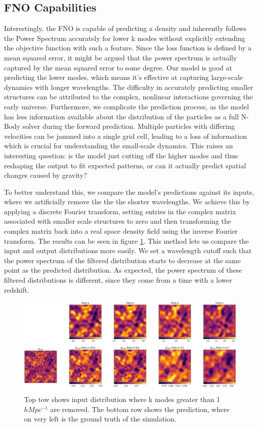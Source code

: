 \documentclass{article}
\begin{document}
\subsection{FNO Capabilities}

Interestingly, the FNO is capable of predicting a density and inherently follows the Power Spectrum accurately for lower k modes without explicitly extending the objective function with such a feature. Since the loss function is defined by a mean squared error, it might be argued that the power spectrum is actually captured by the mean squared error to some degree.
Our model is good at predicting the lower modes, which means it's effective at capturing large-scale dynamics with longer wavelengths. The difficulty in accurately predicting smaller structures can be attributed to the complex, nonlinear interactions governing the early universe. Furthermore, we complicate the prediction process, as the model has less information available about the distribution of the particles as a full N-Body solver during the forward prediction. Multiple particles with differing velocities can be jammed into a single grid cell, leading to a loss of information which is crucial for understanding the small-scale dynamics. This raises an interesting question: is the model just cutting off the higher modes and thus reshaping the output to fit expected patterns, or can it actually predict spatial changes caused by gravity? 

To better understand this, we compare the model's predictions against its inputs, where we artificially remove the the the shorter wavelengths. We achieve this by applying a discrete Fourier transform, setting entries in the complex matrix  associated with smaller scale structures to zero and then transforming the complex matrix back into a real space density field using the inverse Fourier transform. The results can be seen in figure \ref{fig:filter}. This method lets us compare the input and output distributions more easily. We set a wavelength cutoff such that the power spectrum of the filtered distribution starts to decrease at the same point as the predicted distribution. As expected, the power spectrum of these filtered distributions is different, since they come from a time with a lower redshift.

\begin{figure}[h]
    \centering
    \includegraphics[width=0.9\linewidth]{img/compare_filtered.jpg}
    \caption{Top tow shows input distribution where k modes greater than 1 $h Mpc^{-1}$ are removed. The bottom row shows the prediction, where on very left is the ground truth of the simulation.}
    \label{fig:filter}
\end{figure}
\end{document}
